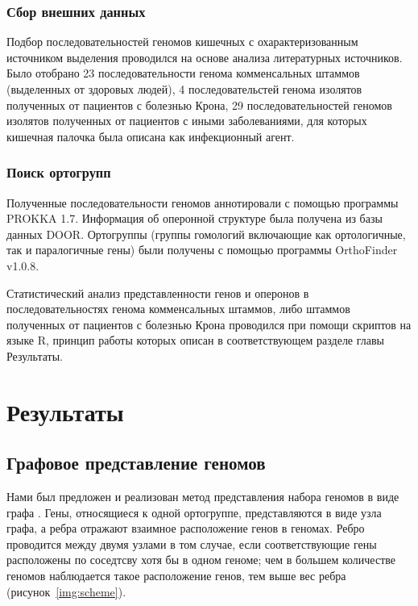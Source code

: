 \subsubsection{Сбор внешних данных}
Подбор последовательностей геномов кишечных с охарактеризованным источником выделения проводился на основе анализа литературных источников. Было отобрано 23 последовательности генома комменсальных штаммов (выделенных от здоровых людей), 4 последовательстей генома изолятов полученных от пациентов с болезнью Крона, 29 последовательностей геномов изолятов полученных от пациентов с иными заболеваниями, для которых кишечная палочка была описана как инфекционный агент.

\subsubsection{Поиск ортогрупп}
Полученные последовательности геномов аннотировали с помощью программы PROKKA 1.7. Информация об оперонной структуре была получена из базы данных DOOR. Ортогруппы (группы гомологий включающие как ортологичные, так и паралогичные гены) были получены с помощью программы OrthoFinder v1.0.8. 

Статистический анализ представленности генов и оперонов в последовательностях генома комменсальных штаммов, либо штаммов полученных от пациентов с болезнью Крона проводился при помощи скриптов на языке R, принцип работы которых описан в соответствующем разделе главы Результаты.


\section*{Результаты}

\subsection*{Графовое представление геномов}

Нами был предложен и реализован метод представления набора геномов в виде графа \cite{manolov2020genome}. Гены, относящиеся к одной ортогруппе, представляются в виде узла графа, а ребра отражают взаимное расположение генов в геномах. Ребро проводится между двумя узлами в том случае, если соответствующие гены расположены по соседтсву хотя бы в одном геноме; чем в большем количестве геномов наблюдается такое расположение генов, тем выше вес ребра (рисунок~\ref{img:scheme}).

